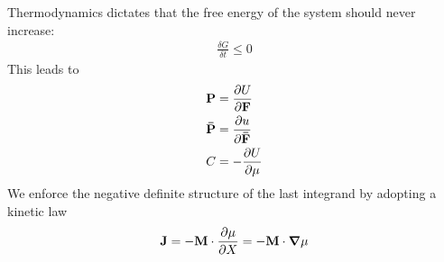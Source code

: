\documentclass[12pt,3p]{article}
\numberwithin{equation}{section}
\begin{document}
Thermodynamics dictates that the free energy of the system should never increase: 
\begin{align}\label{2ndLawThermo}
\frac{\delta G}{\delta t} \leq 0 
\end{align}
This leads to
\begin{align*}
\mathbf{P} &= \pdv{U}{\mathbf{F}} \\
\mathbf{\bar{P}} &= \pdv{u}{\mathbf{\bar{F}}} \\
C &= -\pdv{U}{\mu}
\end{align*}
We enforce the negative definite structure of the last integrand by adopting a kinetic law
\begin{equation}\label{kinLaw}
\mathbf{J} = - \mathbf{M} \cdot \pdv{\mu}{X} = - \mathbf{M} \cdot \grad \mu
\end{equation}

\end{document}
